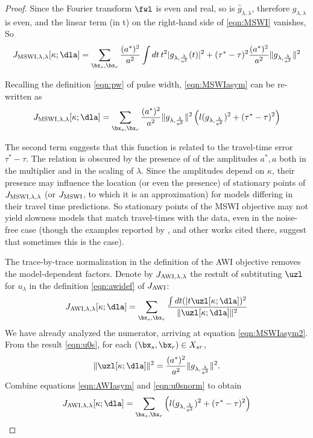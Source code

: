\begin{proof}
Since the Fourier transform $\fwl$ is even and real, so is
$\hat{g}_{\lambda,\lambda}$, therefore $g_{\lambda,\lambda}$ is even, and the linear term (in t) on the
right-hand side of \ref{eqn:MSWI} vanishes, So
\begin{equation}
  \label{eqn:MSWIasym}
  J_{\rm MSWI,\lambda,\lambda}[\kappa;\dla] =
\sum_{\bx_s,\bx_r}\frac{(a^*)^2}{a^2} \int dt\, t^2|g_{\lambda,\frac{\lambda}{a^2}}(t)|^2
+(\tau^*-\tau)^2\frac{(a^*)^2}{a^2}\|g_{\lambda,\frac{\lambda}{a^2}}\|^2
\end{equation}

Recalling the definition \ref{eqn:pw} of pulse width, \ref{eqn:MSWIasym} can be re-written as
\begin{equation}
  \label{eqn:MSWIasym2}
  J_{\rm MSWI,\lambda,\lambda}[\kappa;\dla] = 
  \sum_{\bx_s,\bx_r}\frac{(a^*)^2}{a^2}\|g_{\lambda,\frac{\lambda}{a^2}}\|^2\left(l(g_{\lambda,\frac{\lambda}{a^2}})^2  + (\tau^*-\tau)^2\right)
\end{equation}

The second term suggests that this function
is related to the travel-time error $\tau^*-\tau$. 
The relation is obscured by the presence of of the amplitudes
$a^*, a$ both in the multiplier and in the scaling of $\lambda$. Since the
amplitudes depend on $\kappa$, their presence may influence the location
(or even the presence) of stationary points of $J_{\rm
  MSWI,\lambda,\lambda}$ (or $J_{\rm MSWI}$, to which it is an approximation)  for
models differing in their travel time predictions. So stationary
points of the MSWI objective may not yield slowness models that match
travel-times with the data, even in the noise-free case (though
the examples reported by \cite{HuangSymes2015SEG, HuangSymes:Geo17}, and other works
cited there, suggest that sometimes this is the case).

The trace-by-trace normalization in the definition of
the AWI objective removes the model-dependent factors. Denote by
$J_{\rm AWI, \lambda,\lambda}$ the restult of subtituting
$\uzl$ for $u_{\lambda}$ in the definition \ref{eqn:awidef} of
$J_{\rm AWI}$:
\begin{equation}
  \label{eqn:AWIasym}
J_{\rm AWI,\lambda,\lambda}[\kappa;\dla] = \sum_{\bx_s,\bx_r}\frac{\int dt
(|t\uzl[\kappa;\dla])^2}{\|\uzl[\kappa;\dla]\|^2} 
\end{equation}
We have already analyzed the numerator, arriving at
equation \ref{eqn:MSWIasym2}. From the result \ref{eqn:u0s}, for each
$(\bx_s,\bx_r) \in X_{sr}$,
\begin{equation}
  \label{eqn:u0snorm}
  \|\uzl[\kappa;\dla]\|^2=
  \frac{(a^*)^2}{a^2}\|g_{\lambda,\frac{\lambda}{a^2}}\|^2.
\end{equation}
Combine equations \ref{eqn:AWIasym} and \ref{eqn:u0snorm} to obtain
\begin{equation}
  \label{eqn:AWIasym2}
  J_{\rm AWI,\lambda,\lambda}[\kappa;\dla] = \sum_{\bx_s,\bx_r} \left(l(g_{\lambda,\frac{\lambda}{a^2}})^2  + (\tau^*-\tau)^2\right)
 \end{equation}


\end{proof}
